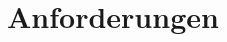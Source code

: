 \chapter{Anforderungen}
\label{sec:requirements_table}

\begin{figure*}
    \centering
    
\end{figure*}